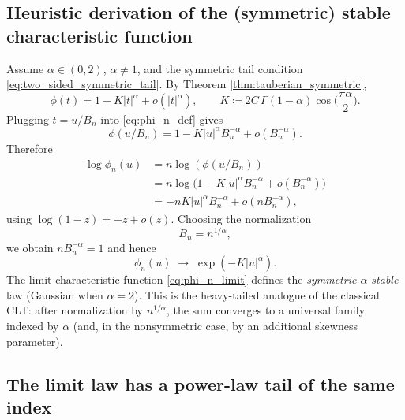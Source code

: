 \documentclass[11pt]{article}
\begin{document}
\subsection{Heuristic derivation of the (symmetric) stable characteristic function}\label{subsec:stable_cf_heuristic}

Assume $\alpha\in(0,2)$, $\alpha\neq 1$, and the symmetric tail condition \eqref{eq:two_sided_symmetric_tail}. By Theorem \ref{thm:tauberian_symmetric},
\begin{equation}\label{eq:small_t_phi_symmetric}
\phi(t)
=
1 - K|t|^\alpha + o(|t|^\alpha),
\qquad
K \coloneqq 2C\,\Gamma(1-\alpha)\cos\!\Big(\frac{\pi\alpha}{2}\Big).
\end{equation}
Plugging $t=u/B_n$ into \eqref{eq:phi_n_def} gives
\begin{equation}\label{eq:phi_expand}
\phi(u/B_n)
=
1 - K|u|^\alpha B_n^{-\alpha} + o(B_n^{-\alpha}).
\end{equation}
Therefore
\begin{align}
\log \phi_n(u)
&= n\log(\phi(u/B_n))
\label{eq:log_phi_n_1}\\
&= n\log\Big(1 - K|u|^\alpha B_n^{-\alpha} + o(B_n^{-\alpha})\Big)
\label{eq:log_phi_n_2}\\
&= -nK|u|^\alpha B_n^{-\alpha} + o\!\left(nB_n^{-\alpha}\right),
\label{eq:log_phi_n_3}
\end{align}
using $\log(1-z)=-z+o(z)$. Choosing the normalization
\begin{equation}\label{eq:Bn_choice}
B_n = n^{1/\alpha},
\end{equation}
we obtain $nB_n^{-\alpha}=1$ and hence
\begin{equation}\label{eq:phi_n_limit}
\phi_n(u)\;\longrightarrow\;\exp\!\left(-K|u|^\alpha\right).
\end{equation}
The limit characteristic function \eqref{eq:phi_n_limit} defines the \emph{symmetric $\alpha$-stable} law (Gaussian when $\alpha=2$). This is the heavy-tailed analogue of the classical CLT: after normalization by $n^{1/\alpha}$, the sum converges to a universal family indexed by $\alpha$ (and, in the nonsymmetric case, by an additional skewness parameter).

\subsection{The limit law has a power-law tail of the same index}\label{subsec:stable_tail}
\end{document}
